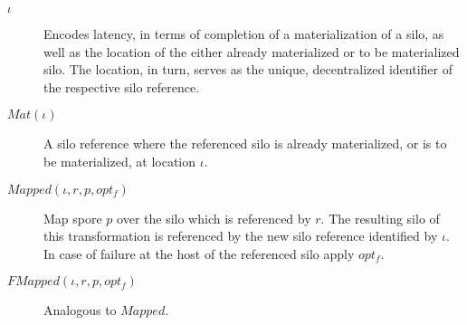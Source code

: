 \documentclass{article}
\theoremstyle{definition}
\begin{document}
\begin{description}
\item[$\iota$] Encodes latency, in terms of completion of a materialization of a silo, as well as the location of the either already materialized or to be materialized silo. The location, in turn, serves as the unique, decentralized identifier of the respective silo reference.

%
%   
%   

\item[$Mat(\iota)$] A silo reference where the referenced silo is already materialized, or is to be materialized, at location $\iota$.

\item[$Mapped(\iota, r, p, opt_f)$] Map spore $p$ over the silo which is referenced by $r$. The resulting silo of this transformation is referenced by the new silo reference identified by $\iota$. In case of failure at the host of the referenced silo apply $opt_f$.  

%

\item[$FMapped(\iota, r, p, opt_f)$] Analogous to $Mapped$.
\end{description}
\end{document}

